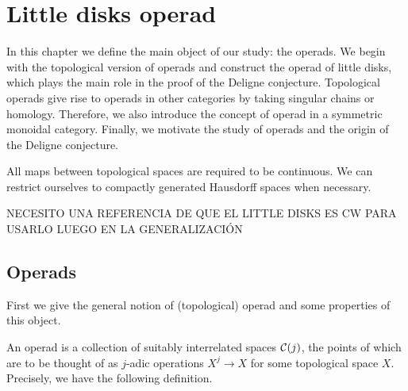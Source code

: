 \documentclass[TFM.tex]{subfiles}
\begin{document}
\chapter{Little disks operad}

In this chapter we define the main object of our study: the operads. We begin with the topological version of operads and construct the operad of little disks, which plays the main role in the proof of the Deligne conjecture. Topological operads give rise to operads in other categories by taking singular chains or homology. Therefore, we also introduce the concept of operad in a symmetric monoidal category. Finally, we motivate the study of operads and the origin of the Deligne conjecture. 

All maps between topological spaces are required to be continuous. We can restrict ourselves to compactly generated Hausdorff spaces when necessary. 

NECESITO UNA REFERENCIA DE QUE EL LITTLE DISKS ES CW PARA USARLO LUEGO EN LA GENERALIZACIÓN


\section{Operads}
First we give the general notion of (topological) operad and some properties of this object.
%


An operad is a collection of suitably interrelated spaces $\mathcal{C}(j)$, the points of which are to
be thought of as $j$-adic operations $X^j \to X$ for some topological space $X$. Precisely, we have the following definition.
\end{document}
